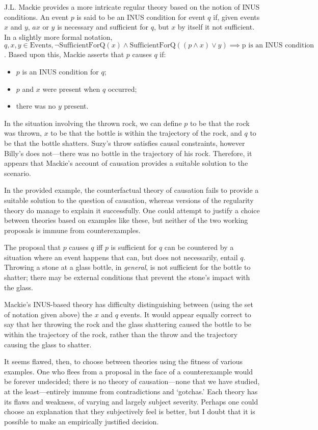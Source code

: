 \documentclass{article}
\begin{document}
J.L. Mackie provides a more intricate regular theory based on the notion of INUS conditions. An event $p$ is said to be an INUS condition for event $q$ if, given events $x$ and $y$, $ax$ or $y$ is necessary and sufficient for $q$, but $x$ by itself it not sufficient. In a slightly more formal notation, $q, x, y \in \text{Events}, \lnot\mathrm{SufficientForQ}(x) \land \mathrm{SufficientForQ}((p \land x) \lor y) \implies \text{p is an INUS condition}$. Based upon this, Mackie asserts that $p$ causes $q$ if:

    \begin{itemize}
    \item $p$ is an INUS condition for $q$;
    \item $p$ and $x$ were present when $q$ occurred;
    \item there was no $y$ present.
    \end{itemize}

In the situation involving the thrown rock, we can define $p$ to be that the rock was thrown, $x$ to be that the bottle is within the trajectory of the rock, and $q$ to be that the bottle shatters. Suzy's throw satisfies causal constraints, however Billy's does not---there was no bottle in the trajectory of his rock. Therefore, it appears that Mackie's account of causation provides a suitable solution to the scenario.

\medbreak

In the provided example, the counterfactual theory of causation fails to provide a suitable solution to the question of causation, whereas versions of the regularity theory do manage to explain it successfully. One could attempt to justify a choice between theories based on examples like these, but neither of the two working proposals is immune from counterexamples.

The proposal that $p$ causes $q$ iff $p$ is sufficient for $q$ can be countered by a situation where an event happens that can, but does not necessarily, entail $q$. Throwing a stone at a glass bottle, in \textit{general}, is not sufficient for the bottle to shatter; there may be external conditions that prevent the stone's impact with the glass.

Mackie's INUS-based theory has difficulty distinguishing between (using the set of notation given above) the $x$ and $q$ events. It would appear equally correct to say that her throwing the rock and the glass shattering caused the bottle to be within the trajectory of the rock, rather than the throw and the trajectory causing the glass to shatter.

It seems flawed, then, to choose between theories using the fitness of various examples. One who flees from a proposal in the face of a counterexample would be forever undecided; there is no theory of causation---none that we have studied, at the least---entirely immune from contradictions and `gotchas.' Each theory has its flaws and weakness, of varying and largely subject severity. Perhaps one could choose an explanation that they subjectively feel is better, but I doubt that it is possible to make an empirically justified decision.
\end{document}
